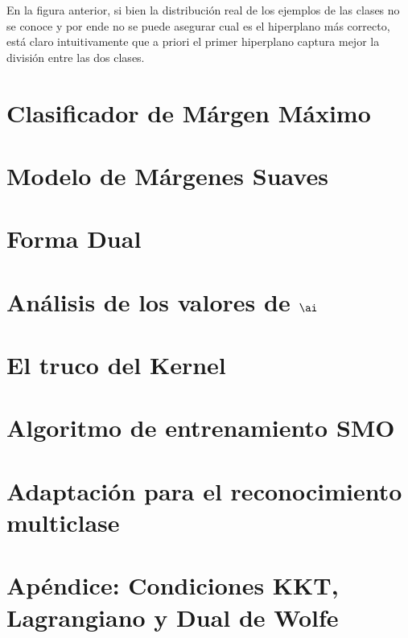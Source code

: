 En la figura anterior, si bien la distribución real de los ejemplos de las clases no se conoce y por ende no se puede asegurar cual es el hiperplano más correcto, está claro intuitivamente que a priori el primer hiperplano captura mejor la división entre las dos clases.

\section{Clasificador de Márgen Máximo}

\section{Modelo de Márgenes Suaves}

\section{Forma Dual}

\section{Análisis de los valores de $\ai$}

\section{El truco del Kernel}

\section{Algoritmo de entrenamiento SMO}

\section{Adaptación para el reconocimiento multiclase}

\section[SVM: Apéndice]{Apéndice: Condiciones KKT, Lagrangiano y Dual de Wolfe}
\label{sec:kkt}
